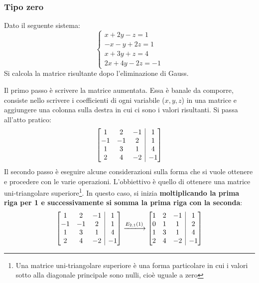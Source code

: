 \documentclass[a4paper]{article}
\makeatletter
\newenvironment{rowequmatbra}[1]{\left[\array{@{}#1@{}}}{\endarray\right]}
\makeatother
\begin{document}
	\subsubsection{Tipo zero}
	
	Dato il seguente sistema:
	\begin{equation*}
		\begin{cases}
			x + 2y - z = 1 	\\
			-x - y + 2z = 1 \\
			x + 3y + z = 4 	\\
			2x + 4y -2z = -1
		\end{cases}
	\end{equation*}
	Si calcola la matrice risultante dopo l'eliminazione di Gauss.\newline
	
	\noindent
	Il \textcolor{Red3}{primo passo} è scrivere la matrice aumentata. Essa è banale da comporre, consiste nello scrivere i coefficienti di ogni variabile ($x,y,z$) in una matrice e aggiungere una colonna sulla destra in cui ci sono i valori risultanti. Si passa all'atto pratico:
	\begin{equation*}
		\begin{rowequmatbra}{ccc|c}
			 1  &  2 & -1 &  1 \\
			-1  & -1 &  2 &  1 \\
			 1  &  3 &  1 &  4 \\
			 2  &  4 & -2 & -1
		\end{rowequmatbra}
	\end{equation*}
	Il \textcolor{Red3}{secondo passo} è eseguire alcune considerazioni sulla forma che si vuole ottenere e procedere con le varie operazioni. L'obbiettivo è quello di ottenere una matrice uni-triangolare superiore\footnote{Una matrice uni-triangolare superiore è una forma particolare in cui i valori sotto alla diagonale principale sono nulli, cioè uguale a zero}. In questo caso, si inizia \textbf{moltiplicando la prima riga per 1 e successivamente si somma la prima riga con la seconda}:
	\begin{equation*}
		\begin{rowequmatbra}{ccc|c}
			1  &  2 & -1 &  1 \\
			-1  & -1 &  2 &  1 \\
			1  &  3 &  1 &  4 \\
			2  &  4 & -2 & -1
		\end{rowequmatbra} \xlongrightarrow{E_{2,1}\left(1\right)}
		\begin{rowequmatbra}{ccc|c}
			1  & 2 & -1 &  1 \\
			0  & 1 &  1 &  2 \\
			1  & 3 &  1 &  4 \\
			2  & 4 & -2 & -1
		\end{rowequmatbra}
	\end{equation*}
\end{document}
